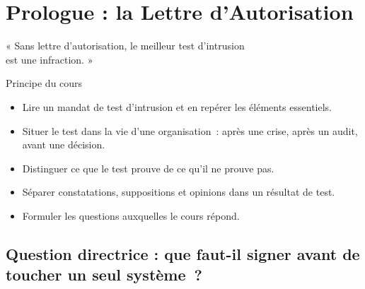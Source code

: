 
\chapter{Prologue : la Lettre d'Autorisation}
\label{chap:prologue}

\epigraph{%
    « Sans lettre d'autorisation, le meilleur test d'intrusion\\
    est une infraction. »%
}{Principe du cours}


\begin{boxobjectifs}
\begin{itemize}
    \item Lire un mandat de test d'intrusion et en repérer les éléments
          essentiels.
    \item Situer le test dans la vie d'une organisation~: après une crise,
          après un audit, avant une décision.
    \item Distinguer ce que le test prouve de ce qu'il ne prouve pas.
    \item Séparer constatations, suppositions et opinions dans un résultat
          de test.
    \item Formuler les questions auxquelles le cours répond.
\end{itemize}
\end{boxobjectifs}

\bigskip

\section*{Question directrice : que faut-il signer avant de toucher un seul système~?}


